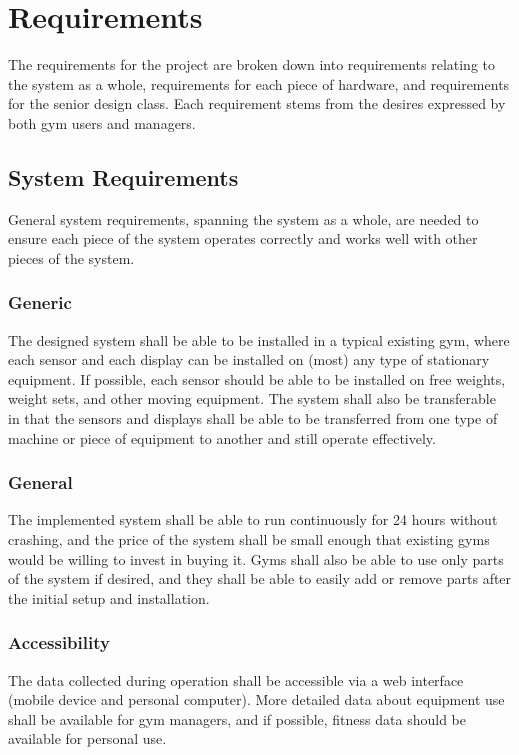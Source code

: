 \documentclass[PPFS.tex]{template/subfiles}
\begin{document}
\section{Requirements}

The requirements for the project are broken down into requirements relating to the system as a whole, requirements for each piece of hardware, and requirements for the senior design class. Each requirement stems from the desires expressed by both gym users and managers.

\subsection{System Requirements}
General system requirements, spanning the system as a whole, are needed to ensure each piece of the system operates correctly and works well with other pieces of the system.

\subsubsection{Generic}
The designed system shall be able to be installed in a typical existing gym, where each sensor and each display can be installed on (most) any type of stationary equipment. If possible, each sensor should be able to be installed on free weights, weight sets, and other moving equipment. The system shall also be transferable in that the sensors and displays shall be able to be transferred from one type of machine or piece of equipment to another and still operate effectively.

\subsubsection{General}
The implemented system shall be able to run continuously for 24 hours without crashing, and the price of the system shall be small enough that existing gyms would be willing to invest in buying it. Gyms shall also be able to use only parts of the system if desired, and they shall be able to easily add or remove parts after the initial setup and installation.

\subsubsection{Accessibility}
The data collected during operation shall be accessible via a web interface (mobile device and personal computer). More detailed data about equipment use shall be available for gym managers, and if possible, fitness data should be available for personal use.
\end{document}
